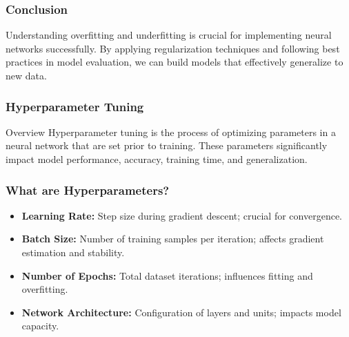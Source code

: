 \documentclass[aspectratio=169]{beamer}
\begin{document}
\begin{frame}[fragile]
  \frametitle{Conclusion}
  Understanding overfitting and underfitting is crucial for implementing neural networks successfully. By applying regularization techniques and following best practices in model evaluation, we can build models that effectively generalize to new data.
\end{frame}

\begin{frame}
    \frametitle{Hyperparameter Tuning}
    \begin{block}{Overview}
        Hyperparameter tuning is the process of optimizing parameters in a neural network that are set prior to training. These parameters significantly impact model performance, accuracy, training time, and generalization.
    \end{block}
\end{frame}

\begin{frame}
    \frametitle{What are Hyperparameters?}
    \begin{itemize}
        \item \textbf{Learning Rate:} Step size during gradient descent; crucial for convergence.
        \item \textbf{Batch Size:} Number of training samples per iteration; affects gradient estimation and stability.
        \item \textbf{Number of Epochs:} Total dataset iterations; influences fitting and overfitting.
        \item \textbf{Network Architecture:} Configuration of layers and units; impacts model capacity.
    \end{itemize}
\end{frame}
\end{document}
